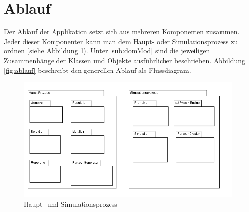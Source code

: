   \section{Ablauf\label{sec:Ablauf}}
    Der Ablauf der Applikation setzt sich aus mehreren Komponenten zusammen.
    Jeder dieser Komponenten kann man dem Haupt- oder Simulationsprozess zu ordnen (siehe Abbildung \ref{fig:hauptSimuProzesse}).
    Unter \ref{sub:domMod} sind die jeweiligen Zusammenhänge der Klassen und Objekte ausführlicher beschrieben.
    Abbildung \ref{fig:ablauf} beschreibt den generellen Ablauf als Flussdiagram.
    \begin{figure}[H]
      \includegraphics[scale=0.45]{graphics/haupt_simulations_prozess}
      \caption{Haupt- und Simulationsprozess}
      \label{fig:hauptSimuProzesse}
    \end{figure}
